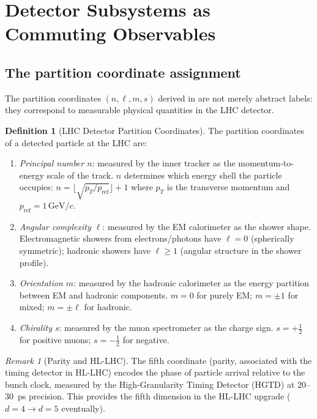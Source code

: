 \documentclass[twocolumn,10pt,a4paper]{article}
\theoremstyle{thmstyle}
\theoremstyle{definition}
\newtheorem{definition}[theorem]{Definition}
\theoremstyle{remark}
\newtheorem{remark}[theorem]{Remark}
\begin{document}
\section{Detector Subsystems as Commuting Observables}
\label{sec:subsystems}

\subsection{The partition coordinate assignment}

The partition coordinates $(n, \ell, m, s)$ derived in
\citet{companion:math} are not merely abstract labels: they correspond
to measurable physical quantities in the LHC detector.

\begin{definition}[LHC Detector Partition Coordinates]
\label{def:detector_coordinates}
The partition coordinates of a detected particle at the LHC are:
\begin{enumerate}[nosep,label=(\roman*)]
\item \emph{Principal number $n$}: measured by the inner tracker as the
momentum-to-energy scale of the track. $n$ determines which energy shell
the particle occupies: $n = \lfloor\sqrt{p_T/p_{\mathrm{ref}}}\rfloor + 1$
where $p_T$ is the transverse momentum and $p_{\mathrm{ref}} = 1\,\mathrm{GeV}/c$.
\item \emph{Angular complexity $\ell$}: measured by the EM calorimeter as
the shower shape. Electromagnetic showers from electrons/photons have
$\ell = 0$ (spherically symmetric); hadronic showers have $\ell \geq 1$
(angular structure in the shower profile).
\item \emph{Orientation $m$}: measured by the hadronic calorimeter as the
energy partition between EM and hadronic components.
$m = 0$ for purely EM; $m = \pm 1$ for mixed; $m = \pm\ell$ for hadronic.
\item \emph{Chirality $s$}: measured by the muon spectrometer as the charge
sign. $s = +\tfrac{1}{2}$ for positive muons; $s = -\tfrac{1}{2}$ for negative.
\end{enumerate}
\end{definition}

\begin{remark}[Parity and HL-LHC]
The fifth coordinate (parity, associated with the timing detector in HL-LHC)
encodes the phase of particle arrival relative to the bunch clock, measured
by the High-Granularity Timing Detector (HGTD) at 20--30~ps precision. This
provides the fifth dimension in the HL-LHC upgrade ($d = 4 \to d = 5$
eventually).
\end{remark}
\end{document}
